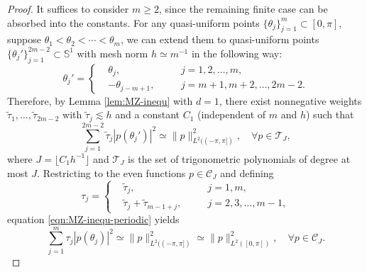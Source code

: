 \documentclass{article}
\numberwithin{equation}{section}
\def\SS{\mathbb{S}}
\begin{document}
\begin{proof}
    It suffices to consider $m\geq2$, since the remaining finite case can be absorbed into the constants.
    For any quasi-uniform points $\{\theta_j\}_{j=1}^m \subset [0,\pi]$, suppose $\theta_1<\theta_2<\cdots <\theta_m$, we can extend them to quasi-uniform points $\{\theta_j'\}_{j=1}^{2m-2} \subset \SS^1$ with mesh norm $h \simeq m^{-1}$ in the following way:
    \begin{equation}\label{eqn:point-extension}
        \theta_j' = \left\{
            \begin{aligned}
                &\theta_j, &&\quad j=1,2,\ldots,m, \\
                &-\theta_{j-m+1}, &&\quad j=m+1,m+2,\ldots,2m-2.
            \end{aligned}\right.
        \end{equation}
    Therefore, by Lemma \ref{lem:MZ-inequ} with $d=1$, there exist nonnegative weights $\tilde\tau_1,\dots,\tilde\tau_{2m-2}$ with $\tilde\tau_j\lesssim h$ and a constant $C_1$ (independent of $m$ and $h$) such that
    \begin{equation}\label{eqn:MZ-inequ-periodic}
        \sum_{j=1}^{2m-2}\tilde\tau_j|p(\theta_j')|^2 \simeq \|p\|_{L^2((-\pi,\pi])}^2, \quad \forall p\in\mathcal{T}_{J},
    \end{equation}
    where $J=\lfloor C_1h^{-1}\rfloor$ and $\mathcal{T}_{J}$ is the set of trigonometric polynomials of degree at most $J$. Restricting to the even functions $p\in\mathcal{C}_J$ and defining
    $$\tau_j = \left\{
    \begin{aligned}
        &\tilde\tau_j, &&\quad j=1,m, \\
        &\tilde\tau_j + \tilde\tau_{m-1+j}, &&\quad j=2,3,\ldots,m-1,
    \end{aligned}\right.$$
    equation \eqref{eqn:MZ-inequ-periodic} yields
    \begin{equation}
        \sum_{j=1}^{m}\tau_j|p(\theta_j)|^2 \simeq \|p\|_{L^2((-\pi,\pi])}^2 \simeq \|p\|_{L^2([0,\pi])}^2, \quad \forall p\in\mathcal{C}_{J}.
    \end{equation}
\end{proof}
\end{document}
